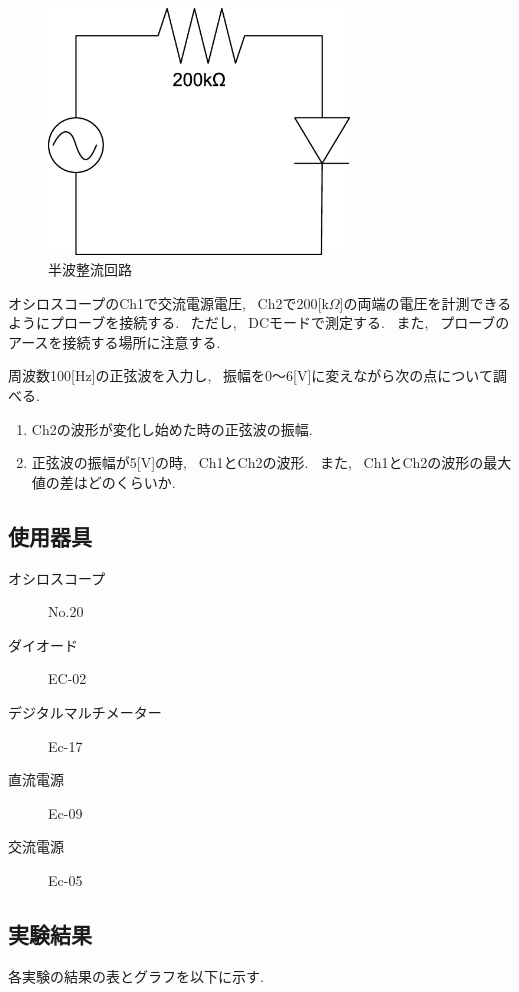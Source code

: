 \documentclass[uplatex,dvipdfmx,a4paper,js=standard, titlepage]{bxjsarticle}
\begin{document}
            \begin{figure}[ht]
                \begin{center}
                    \includegraphics[width=8cm]{images/rectificate.eps}
                    \caption{半波整流回路}
                \end{center}
            \end{figure}

            オシロスコープのCh1で交流電源電圧, ~Ch2で200[k$\Omega$]の両端の電圧を計測できるようにプローブを接続する.
            ~ただし, ~DCモードで測定する. ~また, ~プローブのアースを接続する場所に注意する.

            周波数100[Hz]の正弦波を入力し, ~振幅を0〜6[V]に変えながら次の点について調べる.
            \begin{enumerate}
                \item Ch2の波形が変化し始めた時の正弦波の振幅.
                \item 正弦波の振幅が5[V]の時, ~Ch1とCh2の波形. ~また, ~Ch1とCh2の波形の最大値の差はどのくらいか.
            \end{enumerate}
    \subsection{使用器具}
        \begin{description}
            \item[オシロスコープ] No.20
            \item[ダイオード] EC-02
            \item[デジタルマルチメーター] Ec-17
            \item[直流電源] Ec-09
            \item[交流電源] Ec-05
        \end{description}
    \subsection{実験結果}
        各実験の結果の表とグラフを以下に示す.
\end{document}
